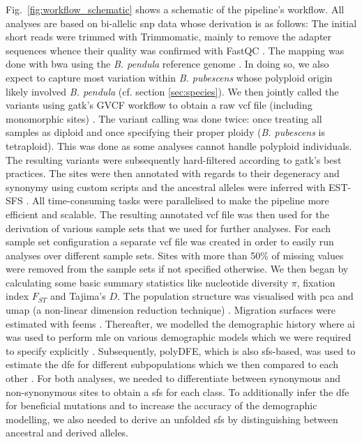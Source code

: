 \documentclass[hidelinks,11pt]{article}
\newcommand{\dadi}{\textdelta a\textdelta i}
\newcommand{\pendula}{\textit{B. pendula}}
\newcommand{\pubescens}{\textit{B. pubescens}}
\begin{document}
{    Fig.~\ref{fig:workflow_schematic} shows a schematic of the pipeline's workflow. All analyses are based on bi-allelic \acrshort{snp} data whose derivation is as follows: The initial short reads were trimmed with Trimmomatic, mainly to remove the adapter sequences whence their quality was confirmed with FastQC \cite{trimmomatic,fastqc}. The mapping was done with \acrshort{bwa} using the \pendula{} reference genome \cite{ref-genome}. In doing so, we also expect to capture most variation within \pubescens{} whose polyploid origin likely involved \pendula{} (cf. section \ref{sec:species}). We then jointly called the variants using \acrshort{gatk}'s GVCF workflow to obtain a raw \acrshort{vcf} file (including monomorphic sites) \cite{gatk}. The variant calling was done twice: once treating all samples as diploid and once specifying their proper ploidy (\pubescens{} is tetraploid). This was done as some analyses cannot handle polyploid individuals. The resulting variants were subsequently hard-filtered according to \acrshort{gatk}'s best practices. The sites were then annotated with regards to their degeneracy and synonymy using custom scripts and the ancestral alleles were inferred with EST-SFS \cite{est-sfs}. All time-consuming tasks were parallelised to make the pipeline more efficient and scalable. The resulting annotated \acrshort{vcf} file was then used for the derivation of various sample sets that we used for further analyses. For each sample set configuration a separate \acrshort{vcf} file was created in order to easily run analyses over different sample sets. Sites with more than 50\% of missing values were removed from the sample sets if not specified otherwise. We then began by calculating some basic summary statistics like nucleotide diversity $\pi$, fixation index $F_{ST}$ and Tajima's $D$. The population structure was visualised with \acrshort{pca} and \acrshort{umap} (a non-linear dimension reduction technique) \cite{umap}. Migration surfaces were estimated with \acrshort{feems} \cite{feems}. Thereafter, we modelled the demographic history where \dadi{} was used to perform \acrfull{mle} on various demographic models which we were required to specify explicitly \cite{dadi}. Subsequently, polyDFE, which is also \acrshort{sfs}-based, was used to estimate the \acrfull{dfe} for different subpopulations which we then compared to each other \cite{polydfe}. For both analyses, we needed to differentiate between synonymous and non-synonymous sites to obtain a \acrfull{sfs} for each class. To additionally infer the \acrshort{dfe} for beneficial mutations and to increase the accuracy of the demographic modelling, we also needed to derive an unfolded \acrshort{sfs} by distinguishing between ancestral and derived alleles.

}
\end{document}
